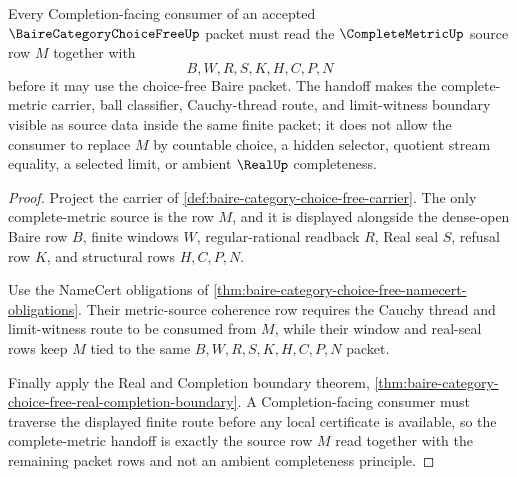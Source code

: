 \begin{theorem}
\label{thm:baire-category-choice-free-complete-metric-handoff}
Every Completion-facing consumer of an accepted $\BaireCategoryChoiceFreeUp$ packet must read the $\CompleteMetricUp$ source row $M$ together with
$$
B,W,R,S,K,H,C,P,N
$$
before it may use the choice-free Baire packet. The handoff makes the complete-metric carrier, ball classifier, Cauchy-thread route, and limit-witness boundary visible as source data inside the same finite packet; it does not allow the consumer to replace $M$ by countable choice, a hidden selector, quotient stream equality, a selected limit, or ambient $\RealUp$ completeness.
\end{theorem}
\begin{proof}
Project the carrier of \autoref{def:baire-category-choice-free-carrier}. The only complete-metric source is the row $M$, and it is displayed alongside the dense-open Baire row $B$, finite windows $W$, regular-rational readback $R$, Real seal $S$, refusal row $K$, and structural rows $H,C,P,N$.

Use the NameCert obligations of \autoref{thm:baire-category-choice-free-namecert-obligations}. Their metric-source coherence row requires the Cauchy thread and limit-witness route to be consumed from $M$, while their window and real-seal rows keep $M$ tied to the same $B,W,R,S,K,H,C,P,N$ packet.

Finally apply the Real and Completion boundary theorem, \autoref{thm:baire-category-choice-free-real-completion-boundary}. A Completion-facing consumer must traverse the displayed finite route before any local certificate is available, so the complete-metric handoff is exactly the source row $M$ read together with the remaining packet rows and not an ambient completeness principle.
\end{proof}


